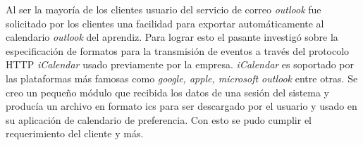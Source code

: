 	Al ser la mayoría de los clientes usuario del servicio de correo \emph{outlook} fue solicitado por los clientes una facilidad para exportar automáticamente al calendario \emph{outlook} del aprendiz. Para lograr esto el pasante investigó sobre la especificación de formatos para la transmisión de eventos a través del protocolo HTTP \emph{iCalendar} usado previamente por la empresa. \emph{iCalendar} es soportado por las plataformas más famosas como \emph{google, apple, microsoft outlook} entre otras. Se creo un pequeño módulo que recibida los datos de una sesión del sistema y producía un archivo en formato ics para ser descargado por el usuario y usado en su aplicación de calendario de preferencia. Con esto se pudo cumplir el requerimiento del cliente y más.



